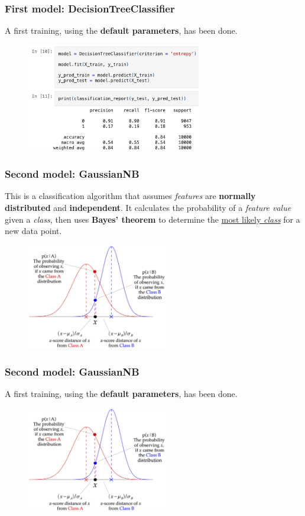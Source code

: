 \documentclass{beamer}
\begin{document}
\begin{frame}
\frametitle{First model: \textbf{DecisionTreeClassifier}}
A first training, using the \textbf{default parameters}, has been done.
\begin{figure}
\centering
    \includegraphics[width=0.68\textwidth]{imgs/dtc_code.png}
    \label{fig:dtc_code}
\end{figure}
\end{frame}

\begin{frame}
\frametitle{Second model: \textbf{GaussianNB}}
This is a classification algorithm that assumes \textit{features} are \textbf{normally distributed} and \textbf{independent}. It calculates the probability of a \textit{feature value} given a \textit{class}, then uses \textbf{Bayes' theorem} to determine the \underline{most likely \textit{class}} for a new data point. 
\begin{figure}
\centering
    \includegraphics[width=0.55\textwidth]{imgs/gnb.png}
    \label{fig:gnb}
\end{figure}
\end{frame}

\begin{frame}
\frametitle{Second model: \textbf{GaussianNB}}
A first training, using the \textbf{default parameters}, has been done.
\begin{figure}
\centering
    \includegraphics[width=0.55\textwidth]{imgs/gnb.png}
    \label{fig:gnb_code}
\end{figure}
\end{frame}
\end{document}
